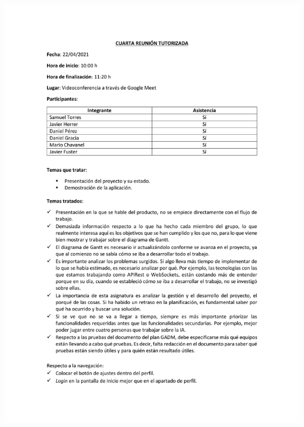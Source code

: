 \documentclass{article}
\begin{document}
\includegraphics[width=\textwidth]{../images/actas/Acta_reunion_tutorizada_4.pdf}
\end{document}
